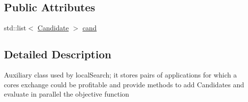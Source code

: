 \subsection*{Public Attributes}
\begin{DoxyCompactItemize}
\item 
std\-::list$<$ \hyperlink{classCandidate}{Candidate} $>$ \hyperlink{classsCandidates_a71334f188ac386cd5958508288487832}{cand}
\end{DoxyCompactItemize}


\subsection{Detailed Description}
Auxiliary class used by local\-Search; it stores pairs of applications for which a cores exchange could be profitable and provide methods to add Candidates and evaluate in parallel the objective function 

